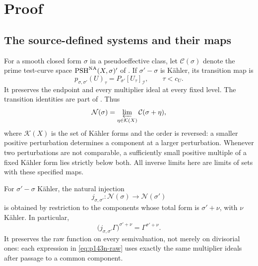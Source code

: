 \section{Proof}

\subsection{The source-defined systems and their maps}

For a smooth closed form \(\sigma\) in a pseudoeffective class, let
\(\mathcal C(\sigma)\) denote the prime test-curve space
\(\operatorname{PSH}^{\mathrm{NA}}(X,\sigma)'\) of \cite[Definition~3.2]{XiaOps}.
If \(\sigma'-\sigma\) is K\"ahler, its transition map is
\[
 p_{\sigma,\sigma'}(U)_\tau=P_{\sigma'}[U_\tau]_{\mathcal I},
 \qquad \tau<c_U.
\]
It preserves the endpoint and every multiplier ideal at every fixed
level. The transition identities are part of
\cite[Definition~3.5]{XiaOps}. Thus
\begin{equation}\label{eq:p143n-system}
 \mathcal N(\sigma)=\varprojlim_{\eta\in\mathcal K(X)}
 \mathcal C(\sigma+\eta),
\end{equation}
where \(\mathcal K(X)\) is the set of K\"ahler forms and the order is
reversed: a smaller positive perturbation determines a component at a
larger perturbation. Whenever two perturbations are not comparable, a
sufficiently small positive multiple of a fixed K\"ahler form lies
strictly below both. All inverse limits here are limits of sets with
these specified maps.

For \(\sigma'-\sigma\) K\"ahler, the natural injection
\cite[(3.5)]{XiaOps}
\[
 j_{\sigma,\sigma'}:\mathcal N(\sigma)\longrightarrow
 \mathcal N(\sigma')
\]
is obtained by restriction to the components whose total form is
\(\sigma'+\nu\), with \(\nu\) K\"ahler. In particular,
\begin{equation}\label{eq:p143n-restriction}
 \bigl(j_{\sigma,\sigma'}\Gamma\bigr)^{\sigma'+\nu}
 =\Gamma^{\sigma'+\nu}.
\end{equation}
It preserves the raw function on every semivaluation, not merely on
divisorial ones: each expression in \eqref{eq:p143n-raw} uses exactly
the same multiplier ideals after passage to a common component.

